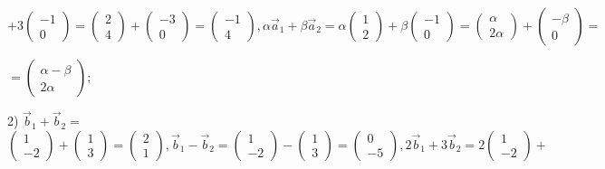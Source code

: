 \documentclass[12pt,a4paper]{article}
\begin{document}
    \(
    +3\begin{pmatrix}
    -1 \\
    0 
    \end{pmatrix}
    =
    \begin{pmatrix}
    2 \\
    4 
    \end{pmatrix} +
    \begin{pmatrix}
    -3 \\
    0 
    \end{pmatrix} = \begin{pmatrix}
    -1 \\
    4 
    \end{pmatrix}
    ,
    \alpha \vec{a}_1 + \beta \vec{a}_2 = 
    \alpha \begin{pmatrix}
    1 \\
    2 
    \end{pmatrix} + \beta \begin{pmatrix}
    -1 \\
    0 
    \end{pmatrix} = \begin{pmatrix}
    \alpha \\
    2 \alpha
    \end{pmatrix} + \begin{pmatrix}
    -\beta \\
    0 
    \end{pmatrix}
    =\)

    \(
    = \begin{pmatrix}
    \alpha-\beta \\
    2\alpha
    \end{pmatrix};
    \)


    2) $\vec{b}_1 + \vec{b}_2 = $ \(
    \begin{pmatrix}
    1 \\
    -2 
    \end{pmatrix} +
    \begin{pmatrix}
    1 \\
    3 
    \end{pmatrix}
     = \begin{pmatrix}
    2 \\
    1 
    \end{pmatrix},
    \vec{b}_1 - \vec{b}_2 = \begin{pmatrix}
    1 \\
    -2 
    \end{pmatrix} -
    \begin{pmatrix}
    1 \\
    3 
    \end{pmatrix}
     = \begin{pmatrix}
    0 \\
    -5 
    \end{pmatrix}
    ,
    2\vec{b}_1 + 3\vec{b}_2 = 2\begin{pmatrix}
    1 \\
    -2 
    \end{pmatrix}+
    \)
\end{document}

